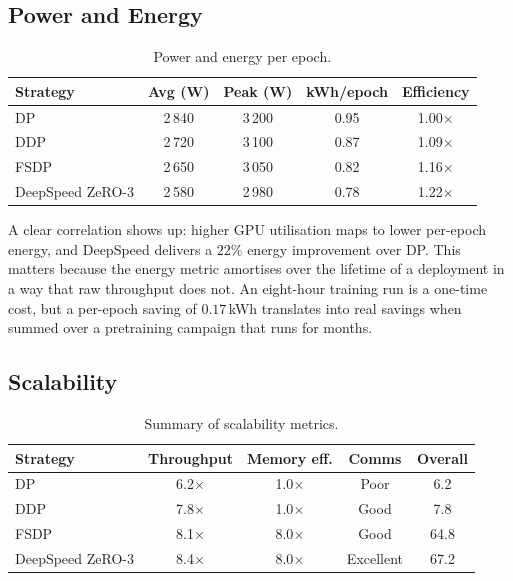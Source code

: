 \subsection{Power and Energy}\label{sec:res_power}
\begin{table}[h]
\centering
\caption{Power and energy per epoch.}
\label{tab:power_consumption}
\begin{tabular}{lcccc}
\toprule
\textbf{Strategy}   & \textbf{Avg (W)} & \textbf{Peak (W)} & \textbf{kWh/epoch} & \textbf{Efficiency} \\
\midrule
DP                  & 2\,840 & 3\,200 & 0.95 & 1.00$\times$ \\
DDP                 & 2\,720 & 3\,100 & 0.87 & 1.09$\times$ \\
FSDP                & 2\,650 & 3\,050 & 0.82 & 1.16$\times$ \\
DeepSpeed ZeRO-3    & 2\,580 & 2\,980 & 0.78 & 1.22$\times$ \\
\bottomrule
\end{tabular}
\end{table}

A clear correlation shows up: higher GPU utilisation maps to
lower per-epoch energy, and DeepSpeed delivers a $22\%$ energy
improvement over DP. This matters because the energy metric
amortises over the lifetime of a deployment in a way that raw
throughput does not. An eight-hour training run is a one-time
cost, but a per-epoch saving of $0.17$\,kWh translates into real
savings when summed over a pretraining campaign that runs for
months.

\subsection{Scalability}\label{sec:res_scale}
\begin{table}[h]
\centering
\caption{Summary of scalability metrics.}
\label{tab:scalability}
\begin{tabular}{lcccc}
\toprule
\textbf{Strategy}       & \textbf{Throughput} & \textbf{Memory eff.} & \textbf{Comms} & \textbf{Overall} \\
\midrule
DP                      & 6.2$\times$ & 1.0$\times$ & Poor      & 6.2  \\
DDP                     & 7.8$\times$ & 1.0$\times$ & Good      & 7.8  \\
FSDP                    & 8.1$\times$ & 8.0$\times$ & Good      & 64.8 \\
DeepSpeed ZeRO-3        & 8.4$\times$ & 8.0$\times$ & Excellent & 67.2 \\
\bottomrule
\end{tabular}
\end{table}

